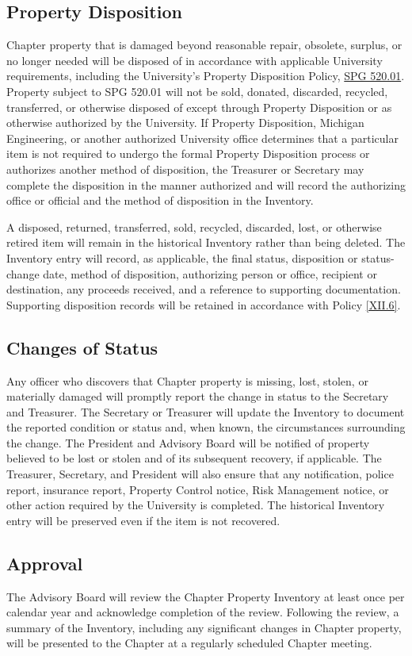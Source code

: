 \subsection{Property Disposition} \label{V.7}
Chapter property that is damaged beyond reasonable repair, obsolete, surplus, or no longer needed will be disposed of in accordance with applicable University requirements, 
including the University’s Property Disposition Policy, \href{https://spg.umich.edu/policy/520.01}{SPG 520.01}. Property subject to SPG 520.01 will not be sold, donated, discarded, recycled, transferred, or otherwise 
disposed of except through Property Disposition or as otherwise authorized by the University. If Property Disposition, Michigan Engineering, or another 
authorized University office determines that a particular item is not required to undergo the formal Property Disposition process or authorizes another method of disposition, 
the Treasurer or Secretary may complete the disposition in the manner authorized and will record the authorizing office or official and the method of disposition in the Inventory.

A disposed, returned, transferred, sold, recycled, discarded, lost, or otherwise retired item will remain in the historical Inventory rather than being deleted. 
The Inventory entry will record, as applicable, the final status, disposition or status-change date, method of disposition, authorizing person or office, recipient or 
destination, any proceeds received, and a reference to supporting documentation. 
Supporting disposition records will be retained in accordance with Policy \ref{XII.6}.

\subsection{Changes of Status} \label{V.8}
Any officer who discovers that Chapter property is missing, lost, stolen, or materially damaged will promptly report the change in status to the Secretary and Treasurer. 
The Secretary or Treasurer will update the Inventory to document the reported condition or status and, when known, the circumstances surrounding the change. 
The President and Advisory Board will be notified of property believed to be lost or stolen and of its subsequent recovery, if applicable. 
The Treasurer, Secretary, and President will also ensure that any notification, police report, insurance report, Property Control notice, Risk Management notice, or other action required by the University is completed. 
The historical Inventory entry will be preserved even if the item is not recovered.

\subsection{Approval} \label{V.9}
The Advisory Board will review the Chapter Property Inventory at least once per calendar year and acknowledge completion of the review. 
Following the review, a summary of the Inventory, including any significant changes in Chapter property, will be presented to the Chapter at a regularly scheduled Chapter meeting.
